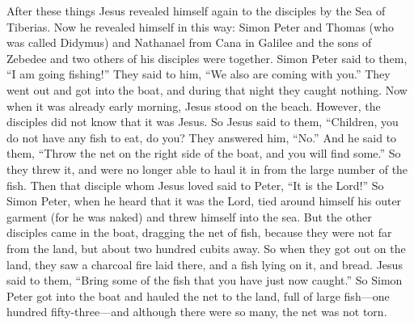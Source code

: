 \begin{biblechapter} %
 After these things Jesus revealed himself again to the disciples by the Sea of Tiberias. Now he revealed himself in this way:
\verse Simon Peter and Thomas (who was called Didymus) and Nathanael from Cana in Galilee and the sons of Zebedee and two others of his disciples were together.
\verse Simon Peter said to them, “I am going fishing!” They said to him, “We also are coming with you.” They went out and got into the boat, and during that night they caught nothing.
\verse Now when it was already early morning, Jesus stood on the beach. However, the disciples did not know that it was Jesus.
\verse So Jesus said to them, “Children, you do not have any fish to eat, do you? They answered him, “No.”
\verse And he said to them, “Throw the net on the right side of the boat, and you will find some.” So they threw it, and were no longer able to haul it in from the large number of the fish.
\verse Then that disciple whom Jesus loved said to Peter, “It is the Lord!” So Simon Peter, when he heard that it was the Lord, tied around himself his outer garment (for he was naked) and threw himself into the sea.
\verse But the other disciples came in the boat, dragging the net of fish, because they were not far from the land, but about two hundred cubits away.
\verse So when they got out on the land, they saw a charcoal fire laid there, and a fish lying on it, and bread.
\verse Jesus said to them, “Bring some of the fish that you have just now caught.”
\verse So Simon Peter got into the boat and hauled the net to the land, full of large fish—one hundred fifty-three—and although there were so many, the net was not torn.

\end{biblechapter}
